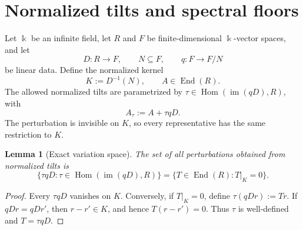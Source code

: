 \documentclass[11pt]{amsart}
\newtheorem{lemma}[theorem]{Lemma}
\theoremstyle{definition}
\newcommand{\kk}{\Bbbk}
\newcommand{\im}{\operatorname{im}}
\newcommand{\End}{\operatorname{End}}
\newcommand{\Hom}{\operatorname{Hom}}
\begin{document}
\section{Normalized tilts and spectral floors}

Let \(\kk\) be an infinite field, let \(R\) and \(F\) be finite-dimensional \(\kk\)-vector spaces, and let
\[
D:R\longrightarrow F, \qquad N\subseteq F, \qquad q:F\longrightarrow F/N
\]
be linear data. Define the normalized kernel
\begin{equation}
K:=D^{-1}(N),
\qquad A\in\End(R).
\label{eq:K}
\end{equation}
The allowed normalized tilts are parametrized by \(\tau\in\Hom(\im(qD),R)\), with
\begin{equation}
A_\tau:=A+\tau qD.
\label{eq:tilt}
\end{equation}
The perturbation is invisible on \(K\), so every representative has the same restriction to
\(K\).

\begin{lemma}[Exact variation space]
The set of all perturbations obtained from normalized tilts is
\begin{equation}
\{\tau qD:\tau\in\Hom(\im(qD),R)\}
=\{T\in\End(R):T|_K=0\}.
\label{eq:variation}
\end{equation}
\end{lemma}

\begin{proof}
Every \(\tau qD\) vanishes on \(K\). Conversely, if \(T|_K=0\), define \(\tau(qD r):=Tr\).
If \(qDr=qDr'\), then \(r-r'\in K\), and hence \(T(r-r')=0\). Thus \(\tau\) is well-defined
and \(T=\tau qD\).
\end{proof}
\end{document}
